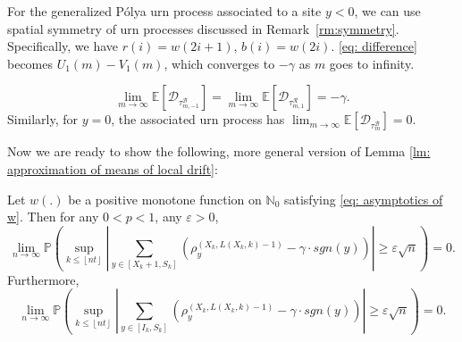 \documentclass[EJP]{ejpecp} %
\newcommand{\abs}[1]{\left\vert #1 \right\vert}
\begin{document}
For the generalized P\'{o}lya urn process associated to a site $y<0$, we can use spatial symmetry of urn processes discussed in Remark~\ref{rm:symmetry}. Specifically, we have $r(i) = w(2i+1)$, $b(i) =w(2i)$. \eqref{eq: difference} becomes $U_1(m)-V_1(m)$, which converges to $-\gamma$ as $m$ goes to infinity.

\begin{equation}\label{eq: general expected drift}
	\lim_{m\to\infty}\mathbb{E}\left[ \mathscr{D}_{\tau^{\mathscr{B}}_{m,-1}} \right] = \lim_{m\to\infty}\mathbb{E}\left[ \mathscr{D}_{\tau^{\mathscr{R}}_{m,1}} \right] = -\gamma.
\end{equation}
Similarly, for $y=0$, the associated urn process has 
$\lim_{m\to\infty}\mathbb{E}\left[ \mathscr{D}_{\tau^{\mathscr{B}}_m} \right] = 0.$

%		
Now we are ready to show the following, more general version of Lemma \ref{lm: approximation of means of local drift}:
\begin{lemma}
	Let $w(.)$ be a positive monotone function on $\mathbb{N}_0$ satisfying \eqref{eq: asymptotics of w}. Then for any $0<p<1$, any $\varepsilon>0$,
	\[
	\lim_{n\to\infty} \mathbb{P}\left( \sup_{k\leq \left\lfloor n t\right\rfloor}  \abs{  	\sum_{y\in \left[X_{k}+1 ,S_{k}\right]} \left( \rho^{(X_k,L(X_k,k)-1)}_y -  \gamma \cdot sgn(y) \right) } \geq  \varepsilon \sqrt{n}     \right) =0.
	\]
	Furthermore,
	\[
	\lim_{n\to\infty} \mathbb{P}\left( \sup_{k\leq \left\lfloor n t\right\rfloor}  \abs{  	\sum_{y\in \left[I_k ,S_{k}\right]} \left( \rho^{(X_k,L(X_k,k)-1)}_y -  \gamma \cdot sgn(y) \right) } \geq  \varepsilon \sqrt{n}     \right) =0.
	\]
\end{lemma}
\end{document}
